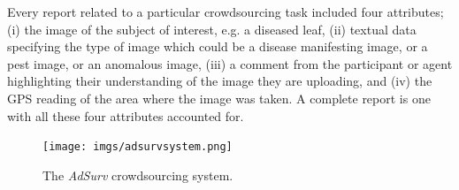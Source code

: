 \documentclass[letterpaper]{article} %
\begin{document}
Every report related to a particular crowdsourcing task included four attributes; (i) the image of the subject of interest, e.g. a diseased leaf, (ii) textual data specifying the type of image which could be a disease manifesting image, or a pest image, or an anomalous image, (iii) a comment from the participant or agent highlighting their understanding of the image they are uploading, and (iv) the GPS reading of the area where the image was taken. A complete report is one with all these four attributes accounted for.


\begin{figure}
\centering
\texttt{[image: imgs/adsurvsystem.png]}
\caption{The \emph{AdSurv} crowdsourcing system.}
\label{adsurvsystem}
\end{figure}





\end{document}
